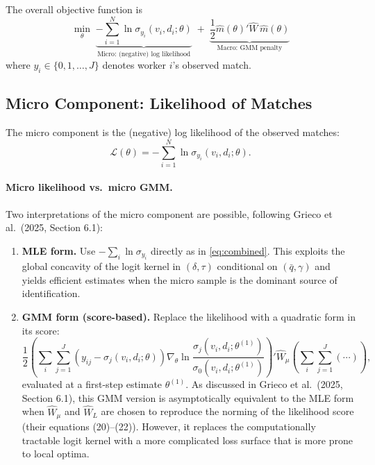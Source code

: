 \documentclass[11pt]{article}
\begin{document}
The overall objective function is
\begin{equation}\label{eq:combined}
\boxed{
\min_{\theta}\; \underbrace{-\sum_{i=1}^N \ln \sigma_{y_i}(v_i, d_i;\theta)}_{\text{Micro: (negative) log likelihood}} \;+\; \underbrace{\frac{1}{2}\hat m(\theta)'\hat W \,\hat m(\theta)}_{\text{Macro: GMM penalty}}
}
\end{equation}
where $y_i\in\{0,1,\ldots,J\}$ denotes worker $i$'s observed match.

\subsection{Micro Component: Likelihood of Matches}

The micro component is the (negative) log likelihood of the observed matches:
\[
\mathcal L(\theta) = -\sum_{i=1}^N \ln\sigma_{y_i}(v_i,d_i;\theta).
\]

\paragraph{Micro likelihood vs.\ micro GMM.} Two interpretations of the micro component are possible, following Grieco et al.\ (2025, Section 6.1):

\begin{enumerate}[label=(\alph*)]
    \item \textbf{MLE form.} Use $-\sum_i \ln\sigma_{y_i}$ directly as in \eqref{eq:combined}. This exploits the global concavity of the logit kernel in $(\delta,\tau)$ conditional on $(\bar q,\gamma)$ and yields efficient estimates when the micro sample is the dominant source of identification.

    \item \textbf{GMM form (score-based).} Replace the likelihood with a quadratic form in its score:
    \[
    \frac{1}{2}\left(\sum_i \sum_{j=1}^{J}\left(y_{ij} - \sigma_j(v_i,d_i;\theta)\right)\nabla_\theta\ln\frac{\sigma_j(v_i,d_i;\theta^{(1)})}{\sigma_0(v_i,d_i;\theta^{(1)})}\right)'\hat W_\mu\left(\sum_i\sum_{j=1}^J (\cdots)\right),
    \]
    evaluated at a first-step estimate $\theta^{(1)}$. As discussed in Grieco et al.\ (2025, Section 6.1), this GMM version is asymptotically equivalent to the MLE form when $\hat W_\mu$ and $\hat W_L$ are chosen to reproduce the norming of the likelihood score (their equations (20)--(22)). However, it replaces the computationally tractable logit kernel with a more complicated loss surface that is more prone to local optima.
\end{enumerate}
\end{document}
